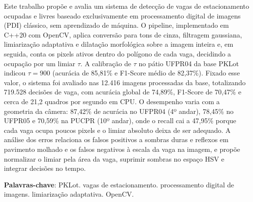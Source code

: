 \documentclass[
	article,			%
	11pt,				%
	oneside,			%
	a4paper,			%
	english,			%
	brazil,				%
	sumario=tradicional
	]{abntex2}
\begin{document}
\frenchspacing
\maketitle

\begin{resumoumacoluna}
Este trabalho propõe e avalia um sistema de detecção de vagas de estacionamento ocupadas e livres baseado exclusivamente em processamento digital de imagens (PDI) clássico, sem aprendizado de máquina. O pipeline, implementado em C++20 com OpenCV, aplica conversão para tons de cinza, filtragem gaussiana, limiarização adaptativa e dilatação morfológica sobre a imagem inteira e, em seguida, conta os pixels ativos dentro do polígono de cada vaga, decidindo a ocupação por um limiar $\tau$. A calibração de $\tau$ no pátio UFPR04 da base PKLot indicou $\tau=900$ (acurácia de 85,81\% e F1-Score médio de 82,37\%). Fixado esse valor, o sistema foi avaliado nas 12.416 imagens processadas da base, totalizando 719.528 decisões de vaga, com acurácia global de 74,89\%, F1-Score de 70,47\% e cerca de 21,2 quadros por segundo em CPU. O desempenho varia com a geometria da câmera: 87,42\% de acurácia no UFPR04 (4º andar), 78,45\% no UFPR05 e 70,59\% na PUCPR (10º andar), onde o recall cai a 47,95\% porque cada vaga ocupa poucos pixels e o limiar absoluto deixa de ser adequado. A análise dos erros relaciona os falsos positivos a sombras duras e reflexos em pavimento molhado e os falsos negativos à escala da vaga na imagem, e propõe normalizar o limiar pela área da vaga, suprimir sombras no espaço HSV e integrar decisões no tempo.

\vspace{\onelineskip}
\noindent
\textbf{Palavras-chave}: PKLot. vagas de estacionamento. processamento digital de imagens. limiarização adaptativa. OpenCV.
\end{resumoumacoluna}
\end{document}
